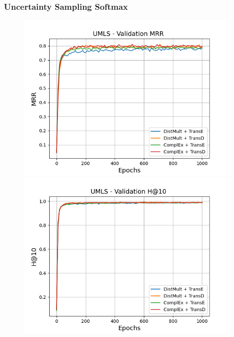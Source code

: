 \subsubsection{Uncertainty Sampling Softmax}
\begin{figure}[H]
    \centering
    \begin{minipage}{.5\textwidth}
      \centering
      \includegraphics[width=\linewidth]{figures/results/gan_train/not_pretrained/uncertainty/max_distribution/entropy/umls/1k_epochs/uncertainty_umls_mrrs.png}
    \end{minipage}%
    \begin{minipage}{.5\textwidth}
      \centering
      \includegraphics[width=\linewidth]{figures/results/gan_train/not_pretrained/uncertainty/max_distribution/entropy/umls/1k_epochs/uncertainty_umls_hit10.png}
    \end{minipage}
    

\end{figure}
